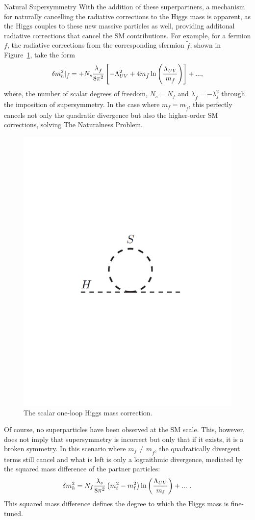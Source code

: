 \begin{section}{Natural Supersymmetry}
With the addition of these superpartners, a mechanism for naturally cancelling the radiative corrections to the Higgs mass is apparent, as the Higgs couples to these new massive particles as well, providing additonal radiative corrections that cancel the SM contributions.
For example, for a fermion $f$, the radiative corrections from the corresponding sfermion $\tilde{f}$, shown in Figure~\ref{fig:higgs_scalar_loop}, take the form
\begin{align}
\delta m_{h}^2|_{\tilde{f}} = +N_s\frac{\lambda_{\tilde{f}}}{8\pi^2} \left[-\Lambda^2_{UV} + 4m_{\tilde{f}}\ln\left(\frac{\Lambda_{UV}}{m_{\tilde{f}}}\right)\right] + ...,
\end{align}
where, the number of scalar degrees of freedom, $N_s = N_f$ and $\lambda_{\tilde{f}} = -\lambda_f^2$ through the imposition of supersymmetry.
In the case where $m_f = m_{\tilde{f}}$, this perfectly cancels not only the quadratic divergence but also the higher-order SM corrections, solving The Naturalness Problem.

\begin{figure}[tbp!]
\begin{center}
\includegraphics[angle=0,width=0.60\columnwidth]{fig/higgs_scalar_loop.pdf}
\end{center}
\caption{The scalar one-loop Higgs mass correction.}
\label{fig:higgs_scalar_loop}
\end{figure}

Of course, no superparticles have been observed at the SM scale.
This, however, does not imply that supersymmetry is incorrect but only that if it exists, it is a broken symmetry.
In this scenario where $m_f \neq m_{\tilde{f}}$, the quadratically divergent terms still cancel and what is left is only a lograithmic divergence, mediated by the squared mass difference of the partner particles:
\begin{align}
\delta m_{h}^2 = N_f\frac{\lambda_s}{8\pi^2} \left(m_t^2 - m_{\tilde{t}}^2\right) \ln\left(\frac{\Lambda_{UV}}{m_{\tilde{t}}}\right) + ...\ .
\label{eqn:total_higgs_correction}
\end{align}
This squared mass difference defines the degree to which the Higgs mass is fine-tuned.

\end{section}

